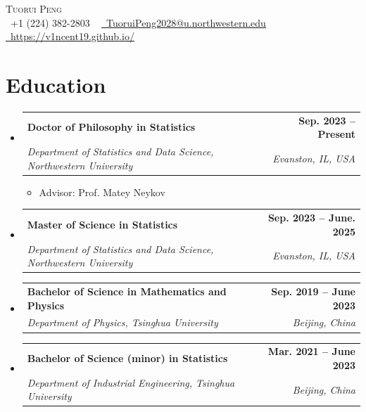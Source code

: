 \documentclass[letterpaper,11pt]{article}
\makeatletter
\newcommand{\resumeItem}[1]{
  \item\small{
    {#1 \vspace{-2pt}}
  }
}
\newcommand{\resumeSubheading}[4]{
  \vspace{-2pt}\item
    \begin{tabular*}{1.0\textwidth}[t]{l@{\extracolsep{\fill}}r}
      \textbf{#1} & \textbf{\small #2} \\
      \textit{\small#3} & \textit{\small #4} \\
    \end{tabular*}\vspace{-7pt}
}
\newcommand{\resumeSubHeadingListStart}{\begin{itemize}[leftmargin=0.0in, label={}]}
\newcommand{\resumeSubHeadingListEnd}{\end{itemize}}
\newcommand{\resumeItemListStart}{\begin{itemize}}
\newcommand{\resumeItemListEnd}{\end{itemize}\vspace{-5pt}}
\makeatother
\begin{document}
\vspace{-100pt}
\begin{center}
    {\Huge \scshape Tuorui Peng} \\ \vspace{4pt}
    \small \raisebox{-0.1\height}\faPhone\ +1 (224) 382-2803 ~ \href{mailto:TuoruiPeng2028@u.northwestern.edu}{\raisebox{-0.2\height}\faEnvelope\  \underline{TuoruiPeng2028@u.northwestern.edu}} ~ 
     \vspace{3pt}
    \href{https://v1ncent19.github.io/}{\raisebox{-0.2\height}\faHome\ \underline{https://v1ncent19.github.io/}}
    \vspace{-8pt}
\end{center}

\section{Education}
  \resumeSubHeadingListStart
    \resumeSubheading
      {Doctor of Philosophy in Statistics}{Sep. 2023 -- Present}{Department of Statistics and Data Science, Northwestern University}
      {Evanston, IL, USA}
        \resumeItemListStart
        \resumeItem{Advisor: Prof. Matey Neykov}
      \resumeItemListEnd
    \resumeSubheading
      {Master of Science in Statistics}{Sep. 2023 -- June. 2025}{Department of Statistics and Data Science, Northwestern University}
      {Evanston, IL, USA}
    \resumeSubheading
      {Bachelor of Science in Mathematics and Physics}{Sep. 2019 -- June 2023}{Department of Physics, Tsinghua University}
      {Beijing, China}
    \resumeSubheading
      {Bachelor of Science (minor) in Statistics}{Mar. 2021 -- June 2023}{Department of Industrial Engineering, Tsinghua University}
      {Beijing, China}
  \resumeSubHeadingListEnd
  
\end{document}
